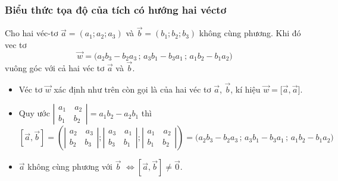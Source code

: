 \subsubsection{Biểu thức tọa độ của tích có hướng hai véctơ}
Cho hai véc-tơ $\vec{a}=(a_1;a_2;a_3)$ và $\vec{b}=(b_1;b_2;b_3)$ không cùng phương. Khi đó vec tơ $$\vec{w}=\bigg(a_2b_3-b_2a_3\,;\,a_3b_1-b_3a_1\,;\,a_1b_2-b_1a_2 \bigg)$$ vuông góc với cả hai véc tơ $\vec{a}$ và $\vec{b}$.
\begin{note}
	\begin{itemize}
		\item [\ding{172}] Véc tơ $\vec{w}$ xác định như trên còn gọi là  của hai véc tơ $\vec{a}$, $\vec{b}$, kí hiệu  $\vec{w}=\big[\vec{a},\vec{a}\big]$.
		\item [\ding{173}] Quy ước $\left|\begin{array}{l}
				      {a_1}\quad{a_2} \\
				      {b_1}\quad{b_2}
			      \end{array}\right|=a_1b_2-a_2b_1$ thì
		      $$\left[\vec a ,\vec b\right]=\left(\left|\begin{array}{l}
					      {a_2}\quad{a_3} \\
					      {b_2}\quad{b_3}
				      \end{array}\right|;\left|\begin{array}{l}
					      {a_3}\quad {a_1} \\
					      {b_3}\quad{b_1}
				      \end{array}\right|;\left|\begin{array}{l}
					      {a_1}\quad{a_2} \\
					      {b_1}\quad{b_2}
				      \end{array}\right|\right)=\bigg(a_2b_3-b_2a_3\,;\,a_3b_1-b_3a_1\,;\,a_1b_2-b_1a_2 \bigg) $$
		\item [\ding{174}] $\vec{a}$ không cùng phương với $\vec{b}$ $\Leftrightarrow \left[\vec a ,\vec b\right] \ne \vec{0}$.
	\end{itemize}
\end{note}
